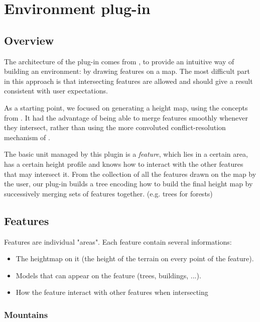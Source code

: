 \section{Environment plug-in}

\subsection{Overview}

The architecture of the plug-in comes from
\cite{DeclarativeArchitecture}, to provide an intuitive way of
building an environment: by drawing features on a map. The most
difficult part in this approach is that intersecting features are
allowed and should give a result consistent with user expectations.

As a starting point, we focused on generating a height map, using the
concepts from \cite{FeatureTree}. It had the advantage of being able
to merge features smoothly whenever they intersect, rather than using
the more convoluted conflict-resolution mechanism of
\cite{DeclarativeArchitecture}.

\bigskip

The basic unit managed by this plugin is a \emph{feature}, which lies
in a certain area, has a certain height profile and knows how to
interact with the other features that may intersect it. From the
collection of all the features drawn on the map by the user, our
plug-in builds a tree encoding how to build the final height map by
successively merging sets of features together.  %
(e.g. trees for forests)



\subsection{Features}
Features are individual "areas". Each feature contain several informations:
\begin{itemize}
  \item The heightmap on it (the height of the terrain on every point of the feature).
  \item Models that can appear on the feature (trees, buildings, ...).
  \item How the feature interact with other features when intersecting
\end{itemize}

\subsubsection{Mountains}

